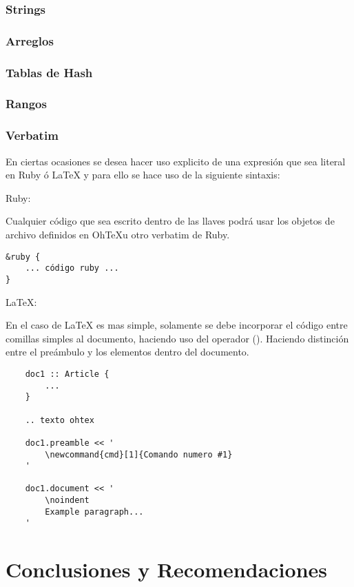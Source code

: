 \documentclass[12pt,letterpaper,titlepage,oneside,openright]{book}
\newcommand{\latex}{\LaTeX\xspace}
\newcommand{\ohtex}{OhTeX}
\newcommand{\ttcode}[1]{(\texttt{#1})}
\begin{document}
\subsection{Strings}

\subsection{Arreglos}

\subsection{Tablas de Hash}

\subsection{Rangos}

\subsection{Verbatim}

En ciertas ocasiones se desea hacer uso explicito de una expresión que sea
literal en Ruby ó \latex y para ello se hace uso de la siguiente sintaxis:

Ruby:

Cualquier código que sea escrito dentro de las llaves podrá usar los objetos de
archivo definidos en \ohtex u otro verbatim de Ruby.

\begin{verbatim}
&ruby {
    ... código ruby ...
}
\end{verbatim}

\LaTeX:

En el caso de \latex es mas simple, solamente se debe incorporar el código entre
comillas simples al documento, haciendo uso del operador \ttcode{\<\<}. Haciendo
distinción entre el preámbulo y los elementos dentro del documento.

\begin{center}
\begin{lstlisting}
    doc1 :: Article {
        ...
    }

    .. texto ohtex

    doc1.preamble << '
        \newcommand{cmd}[1]{Comando numero #1}
    '

    doc1.document << '
        \noindent
        Example paragraph...
    '
\end{lstlisting}
\end{center}


\chapter{Conclusiones y Recomendaciones}
\lipsum[1-2]
\end{document}
